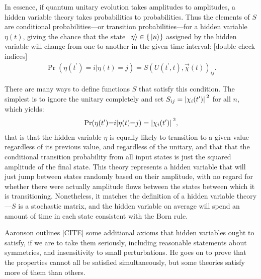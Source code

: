 In essence, if quantum unitary evolution takes amplitudes to amplitudes, a hidden variable theory takes probabilities to probabilities. Thus the elements of $S$ are conditional probabilities---or transition probabilities---for a hidden variable $\eta(t)$, giving the chance that the state $\ket\eta \in \{\ket{n}\}$ assigned by the hidden variable will change from one to another in the given time interval:
[double check indices]
\begin{align}\label{eq:conditional_probability}
\Pr(\eta(t^\prime){=}i|\eta(t){=}j) = S(U(t^\prime, t), \vec\chi(t))_{ij}.
\end{align}

There are many ways to define functions $S$ that satisfy this condition. The simplest is to ignore the unitary completely and set $S_{ij} = \abs{\chi_i(t^\prime)}^2$ for all $n$, which yields:
\begin{align}
\Pr(\eta(t^\prime){=}i|\eta(t){=}j) = \abs{\chi_{i}(t^\prime)}^2,
\end{align}
that is that the hidden variable $\eta$ is equally likely to transition to a given value regardless of its previous value, and regardless of the unitary, and that that the conditional transition probability from all input states is just the squared amplitude of the final state. This theory represents a hidden variable that will just jump between states randomly based on their amplitude, with no regard for whether there were actually amplitude flows between the states between which it is transitioning. Nonetheless, it matches the definition of a hidden variable theory---$S$ is a stochastic matrix, and the hidden variable on average will spend an amount of time in each state consistent with the Born rule.

Aaronson outlines [CITE] some additional axioms that hidden variables ought to satisfy, if we are to take them seriously, including reasonable statements about symmetries, and insensitivity to small perturbations. He goes on to prove that the properties cannot all be satisfied simultaneously, but some theories satisfy more of them than others.

